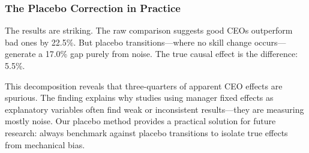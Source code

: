 \documentclass[11pt,a4paper]{article}
\begin{document}
\subsubsection{The Placebo Correction in Practice}

The results are striking. The raw comparison suggests good CEOs outperform bad ones by 22.5\%. But placebo transitions—where no skill change occurs—generate a 17.0\% gap purely from noise. The true causal effect is the difference: 5.5\%.

This decomposition reveals that three-quarters of apparent CEO effects are spurious. The finding explains why studies using manager fixed effects as explanatory variables often find weak or inconsistent results—they are measuring mostly noise. Our placebo method provides a practical solution for future research: always benchmark against placebo transitions to isolate true effects from mechanical bias.
\end{document}
